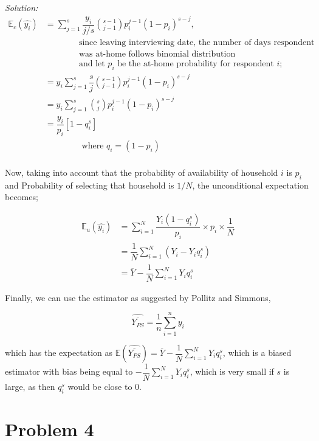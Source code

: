 \documentclass[12pt]{article}
\newcommand{\E}{\mathbb{E}}
\theoremstyle{definition}
\newenvironment{answer}{\textit{Solution: }\quad }{ \hfill \qedsymbol}
\begin{document}
\begin{answer}
	\begin{align*}
		\E_c(\widehat{y_i})
		& = \sum_{j = 1}^{s} \dfrac{y_i}{j/s} \binom{s-1}{j-1} p_i^{j-1} (1 - p_i)^{s-j}, \\
		& \qquad \qquad \text{since leaving interviewing date, the number of days respondent}\\
		& \qquad \qquad \text{was at-home follows binomial distribution}\\
		& \qquad \qquad \text{and let } p_i \text{ be the at-home probability for respondent } i;\\ 
		& = y_i \sum_{j = 1}^{s} \dfrac{s}{j} \binom{s-1}{j-1} p_i^{j-1} (1 - p_i)^{s-j}\\
		& = y_i \sum_{j = 1}^{s} \binom{s}{j} p_i^{j-1} (1 - p_i)^{s-j}\\
		& = \dfrac{y_i}{p_i} \left[ 1 - q_i^s \right]\\
		& \qquad \qquad \text{ where } q_i = (1 - p_i)\\
	\end{align*}

	Now, taking into account that the probability of availability of household $i$ is $p_i$ and Probability of selecting that household is $1/N$, the unconditional expectation becomes;

	\begin{align*}
		\E_u(\widehat{y_i})
		& = \sum_{i = 1}^{N} \dfrac{Y_i (1 - q_i^s)}{p_i} \times p_i \times \dfrac{1}{N}\\
    	& = \dfrac{1}{N} \sum_{i = 1}^{N} \left( Y_i - Y_i q_i^s \right)\\
    	& = \overline{Y} - \dfrac{1}{N} \sum_{i=1}^{N} Y_i q_i^s
	\end{align*}

	Finally, we can use the estimator as suggested by Pollitz and Simmons, 

	$$\widehat{\overline{Y_{PS}}} = \dfrac{1}{n} \sum_{i=1}^{n} y_i$$

	which has the expectation as $\E(\widehat{\overline{Y_{PS}}}) = \overline{Y} - \dfrac{1}{N} \sum_{i=1}^{N} Y_i q_i^s$, which is a biased estimator with bias being equal to $-\dfrac{1}{N} \sum_{i=1}^{N} Y_i q_i^s$, which is very small if $s$ is large, as then $q_i^s$ would be close to 0.	

\end{answer}


\section{Problem 4}
\end{document}
